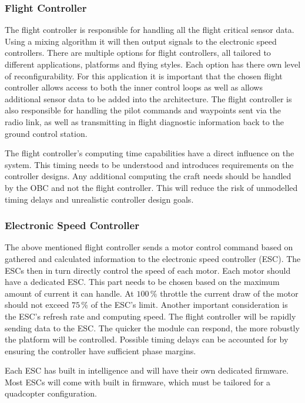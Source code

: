			\subsubsection{Flight Controller}
			The flight controller is responsible for handling all the flight critical sensor data. Using a mixing algorithm it will then output signals to the electronic speed controllers. There are multiple options for flight controllers, all tailored to different applications, platforms and flying styles. Each option has there own level of reconfigurability. For this application it is important that the chosen flight controller allows access to both the inner control loops as well as allows additional sensor data to be added into the architecture. The flight controller is also responsible for handling the pilot commands and waypoints sent via the radio link, as well as transmitting in flight diagnostic information back to the ground control station.
			
			The flight controller's computing time capabilities have a direct influence on the system. This timing needs to be understood and introduces requirements on the controller designs. Any additional computing the craft needs should be handled by the OBC and not the flight controller. This will reduce the risk of unmodelled timing delays and unrealistic controller design goals.
			
			\subsubsection{Electronic Speed Controller}
			The above mentioned flight controller sends a motor control command based on gathered and calculated information to the electronic speed controller (ESC). The ESCs then in turn directly control the speed of each motor. Each motor should have a dedicated ESC. This part needs to be chosen based on the maximum amount of current it can handle. At $100$\,\% throttle the current draw of the motor should not exceed $75$\,\% of the ESC's limit. Another important consideration is the ESC's refresh rate and computing speed. The flight controller will be rapidly sending data to the ESC. The quicker the module can respond, the more robustly the platform will be controlled. Possible timing delays can be accounted for by ensuring the controller have sufficient phase margins. 
			
			Each ESC has built in intelligence and will have their own dedicated firmware. Most ESCs will come with built in firmware, which must be tailored for a quadcopter configuration.
			
